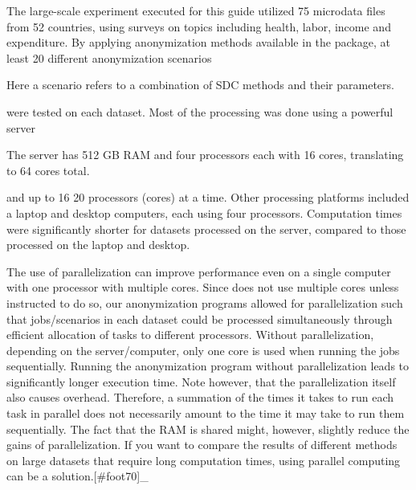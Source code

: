 \documentclass[letterpaper,10pt,english]{sphinxmanual}
\begin{document}
The large-scale experiment executed for this guide utilized 75 microdata
files from 52 countries, using surveys on topics including health,
labor, income and expenditure. By applying anonymization methods
available in the  package, at least 20 different anonymization
scenarios %
\begin{footnote}[9]\sphinxAtStartFootnote
Here a scenario refers to a combination of SDC methods and their
parameters.
%
\end{footnote} were tested on each dataset. Most of the
processing was done using a powerful server %
\begin{footnote}[10]\sphinxAtStartFootnote
The server has 512 GB RAM and four processors each with 16 cores,
translating to 64 cores total.
%
\end{footnote} and up
to 16 \textendash{} 20 processors (cores) at a time. Other processing platforms
included a laptop and desktop computers, each using four processors.
Computation times were significantly shorter for datasets processed on
the server, compared to those processed on the laptop and desktop.

The use of parallelization can improve performance even on a single
computer with one processor with multiple cores. Since  does not use
multiple cores unless instructed to do so, our anonymization programs
allowed for parallelization such that jobs/scenarios in each dataset
could be processed simultaneously through efficient allocation of tasks
to different processors. Without parallelization, depending on the
server/computer, only one core is used when running the jobs
sequentially. Running the anonymization program without parallelization
leads to significantly longer execution time. Note however, that the
parallelization itself also causes overhead. Therefore, a summation of
the times it takes to run each task in parallel does not necessarily
amount to the time it may take to run them sequentially. The fact that
the RAM is shared might, however, slightly reduce the gains of
parallelization. If you want to compare the results of different methods
on large datasets that require long computation times, using parallel
computing can be a solution.{[}\#foot70{]}\_
\end{document}
